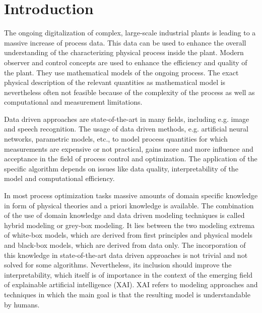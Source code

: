 
\chapter{Introduction} \label{cha:introduction}


The ongoing digitalization of complex, large-scale industrial plants is leading to a massive increase of process data. This data can be used to enhance the overall understanding of the characterizing physical process inside the plant. Modern observer and control concepts are used to enhance the efficiency and quality  of the plant. They use mathematical models of the ongoing process. The exact physical description of the relevant quantities as mathematical model is nevertheless often not feasible because of the complexity of the process as well as computational and measurement limitations.

Data driven approaches are state-of-the-art in many fields, including e.g. image and speech recognition. The usage of data driven methods, e.g. artificial neural networks, parametric models, etc., to model process quantities for which measurements are expensive or not practical, gains more and more influence and acceptance in the field of process control and optimization. The application of the specific algorithm depends on issues like data quality, interpretability of the model and computational efficiency. 

In most process optimization tasks massive amounts of domain specific knowledge in form of physical theories and a priori knowledge is available. The combination of the use of domain knowledge and data driven modeling techniques is called hybrid modeling or grey-box modeling. It lies between the two modeling extrema of white-box models, which are derived from first principles and physical models and black-box models, which are derived from data only\cite{ashby1961introduction}. The incorporation of this knowledge in state-of-the-art data driven approaches is not trivial and not solved for some algorithms. Nevertheless, its inclusion should improve the interpretability, which itself is of importance in the context of the emerging field of explainable artificial intelligence (XAI). XAI refers to modeling approaches and techniques in which the main goal is that the resulting model is understandable by humans\cite{dovsilovic2018explainable}.

